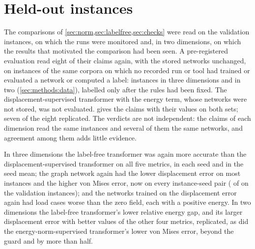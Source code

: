 \section{Held-out instances}\label{sec:holdout}



The comparisons of \cref{sec:norm,sec:labelfree,sec:checks} were read on the validation
instances, on which the runs were monitored and, in two dimensions, on which the results
that motivated the comparison had been seen. A pre-registered evaluation read eight of their
claims again, with the stored networks unchanged, on instances of the same corpora on which
no recorded run or tool had trained or evaluated a network or computed a label:
\numHoldThreeN{} instances in three dimensions and \numHoldTwoN{} in two
(\cref{sec:methods:data}), labelled only after the rules had been fixed. The
displacement-supervised transformer with the energy term, whose networks were not stored,
was not evaluated.  gives the claims with their values on both sets; seven
of the eight replicated. The verdicts are not independent: the claims of each dimension read
the same instances and several of them the same networks, and agreement among them adds
little evidence.

In three dimensions the label-free transformer was again more accurate than the
displacement-supervised transformer on all five metrics, in each seed and in the seed mean;
the graph network again had the lower displacement error on most instances and the higher
von Mises error, now on every instance-seed pair (\numMgnVmHigher{} of \numThreePairs{} on
the validation instances); and the networks trained on the displacement error again had load
cases worse than the zero field, each with a positive energy. In two dimensions the
label-free transformer's lower relative energy gap, and its larger displacement error with
better values of the other four metrics, replicated, as did the energy-norm-supervised
transformer's lower von Mises error, beyond the guard and by more than half.

